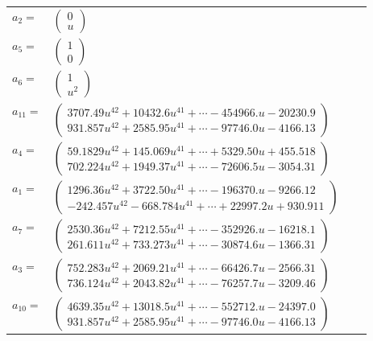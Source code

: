 \documentclass[1p]{elsarticle_modified}
\theoremstyle{definition}
\begin{document}
\begin{tabular}{m{7pt} m{180pt} m{7pt} m{180pt} }
\flushright $a_{2}=$&$\begin{pmatrix}0\\u\end{pmatrix}$ \\
\flushright $a_{5}=$&$\begin{pmatrix}1\\0\end{pmatrix}$ \\
\flushright $a_{6}=$&$\begin{pmatrix}1\\u^2\end{pmatrix}$ \\
\flushright $a_{11}=$&$\begin{pmatrix}3707.49 u^{42}+10432.6 u^{41}+\cdots-454966. u-20230.9\\931.857 u^{42}+2585.95 u^{41}+\cdots-97746.0 u-4166.13\end{pmatrix}$ \\
\flushright $a_{4}=$&$\begin{pmatrix}59.1829 u^{42}+145.069 u^{41}+\cdots+5329.50 u+455.518\\702.224 u^{42}+1949.37 u^{41}+\cdots-72606.5 u-3054.31\end{pmatrix}$ \\
\flushright $a_{1}=$&$\begin{pmatrix}1296.36 u^{42}+3722.50 u^{41}+\cdots-196370. u-9266.12\\-242.457 u^{42}-668.784 u^{41}+\cdots+22997.2 u+930.911\end{pmatrix}$ \\
\flushright $a_{7}=$&$\begin{pmatrix}2530.36 u^{42}+7212.55 u^{41}+\cdots-352926. u-16218.1\\261.611 u^{42}+733.273 u^{41}+\cdots-30874.6 u-1366.31\end{pmatrix}$ \\
\flushright $a_{3}=$&$\begin{pmatrix}752.283 u^{42}+2069.21 u^{41}+\cdots-66426.7 u-2566.31\\736.124 u^{42}+2043.82 u^{41}+\cdots-76257.7 u-3209.46\end{pmatrix}$ \\
\flushright $a_{10}=$&$\begin{pmatrix}4639.35 u^{42}+13018.5 u^{41}+\cdots-552712. u-24397.0\\931.857 u^{42}+2585.95 u^{41}+\cdots-97746.0 u-4166.13\end{pmatrix}$ \\

\end{tabular}
\end{document}
